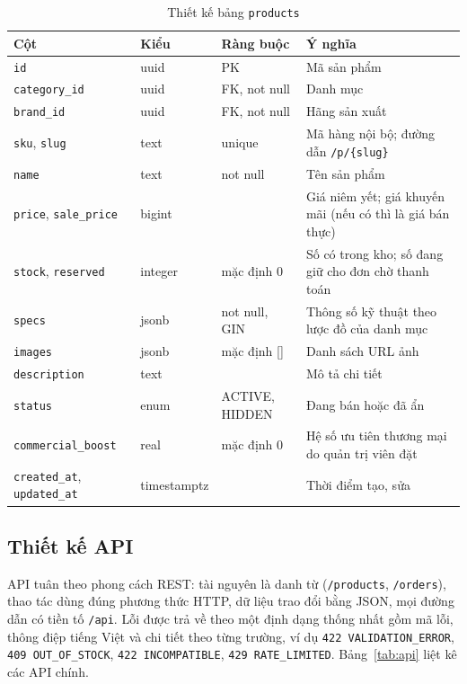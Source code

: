 \begin{table}[H]
\centering\footnotesize\renewcommand{\arraystretch}{1.15}
\begin{tabular}{|L{3.4cm}|L{1.9cm}|L{2.4cm}|L{5.8cm}|}
\hline
\textbf{Cột} & \textbf{Kiểu} & \textbf{Ràng buộc} & \textbf{Ý nghĩa} \\ \hline
\texttt{id} & uuid & PK & Mã sản phẩm \\ \hline
\texttt{category\_id} & uuid & FK, not null & Danh mục \\ \hline
\texttt{brand\_id} & uuid & FK, not null & Hãng sản xuất \\ \hline
\texttt{sku}, \texttt{slug} & text & unique & Mã hàng nội bộ; đường dẫn \texttt{/p/\{slug\}} \\ \hline
\texttt{name} & text & not null & Tên sản phẩm \\ \hline
\texttt{price}, \texttt{sale\_price} & bigint & & Giá niêm yết; giá khuyến mãi (nếu có thì là giá bán thực) \\ \hline
\texttt{stock}, \texttt{reserved} & integer & mặc định 0 & Số có trong kho; số đang giữ cho đơn chờ thanh toán \\ \hline
\texttt{specs} & jsonb & not null, GIN & Thông số kỹ thuật theo lược đồ của danh mục \\ \hline
\texttt{images} & jsonb & mặc định [] & Danh sách URL ảnh \\ \hline
\texttt{description} & text & & Mô tả chi tiết \\ \hline
\texttt{status} & enum & ACTIVE, HIDDEN & Đang bán hoặc đã ẩn \\ \hline
\texttt{commercial\_boost} & real & mặc định 0 & Hệ số ưu tiên thương mại do quản trị viên đặt \\ \hline
\texttt{created\_at}, \texttt{updated\_at} & timestamptz & & Thời điểm tạo, sửa \\ \hline
\end{tabular}
\caption{Thiết kế bảng \texttt{products}}
\label{tab:products}
\end{table}

\subsection{Thiết kế API}

API tuân theo phong cách REST: tài nguyên là danh từ (\texttt{/products}, \texttt{/orders}), thao tác dùng đúng phương thức HTTP, dữ liệu trao đổi bằng JSON, mọi đường dẫn có tiền tố \texttt{/api}. Lỗi được trả về theo một định dạng thống nhất gồm mã lỗi, thông điệp tiếng Việt và chi tiết theo từng trường, ví dụ \texttt{422 VALIDATION\_ERROR}, \texttt{409 OUT\_OF\_STOCK}, \texttt{422 INCOMPATIBLE}, \texttt{429 RATE\_LIMITED}. Bảng~\ref{tab:api} liệt kê các API chính.

